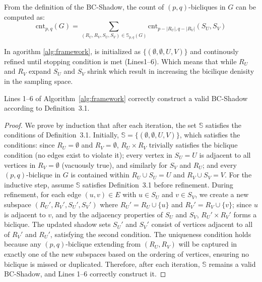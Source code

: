 From the definition of the BC-Shadow, the count of $(p,q)$-bicliques in $G$ can be computed as:
\[
\text{cnt}_{p,q}(G) = \sum_{(R_U, R_V, S_U, S_V) \in \mathbb{S}_{p,q}(G)} \text{cnt}_{p - |R_U|, q - |R_V|}(S_U, S_V)
\]

In agorithm \ref{alg:framework}, \shadow is initialized as $\{(\emptyset,\emptyset,U,V )\}$ and continously refined until stopping condition is met (Lines1--6). Which means that while $R_U$ and $R_V$ expand $S_U$ and $S_V$ shrink which result in increasing the bicilique denisity in the sampling space.


\begin{lemma}
	Lines 1--6 of Algorithm~\ref{alg:framework} correctly construct a valid BC-Shadow according to Definition~3.1.
\end{lemma}

\begin{proof}
	We prove by induction that after each iteration, the set $\mathbb{S}$ satisfies the conditions of Definition~3.1. Initially, $\mathbb{S} = \{ (\emptyset, \emptyset, U, V) \}$, which satisfies the conditions: since $R_U = \emptyset$ and $R_V = \emptyset$, $R_U \times R_V$ trivially satisfies the biclique condition (no edges exist to violate it); every vertex in $S_U = U$ is adjacent to all vertices in $R_V = \emptyset$ (vacuously true), and similarly for $S_V$ and $R_U$; and every $(p,q)$-biclique in $G$ is contained within $R_U \cup S_U = U$ and $R_V \cup S_V = V$. For the inductive step, assume $\mathbb{S}$ satisfies Definition~3.1 before refinement. During refinement, for each edge $(u, v) \in E$ with $u \in S_U$ and $v \in S_V$, we create a new subspace $(R_U', R_V', S_U', S_V')$ where $R_U' = R_U \cup \{ u \}$ and $R_V' = R_V \cup \{ v \}$; since $u$ is adjacent to $v$, and by the adjacency properties of $S_U$ and $S_V$, $R_U' \times R_V'$ forms a biclique. The updated shadow sets $S_U'$ and $S_V'$ consist of vertices adjacent to all of $R_V'$ and $R_U'$, satisfying the second condition. The uniqueness condition holds because any $(p,q)$-biclique extending from $(R_U, R_V)$ will be captured in exactly one of the new subspaces based on the ordering of vertices, ensuring no biclique is missed or duplicated. Therefore, after each iteration, $\mathbb{S}$ remains a valid BC-Shadow, and Lines 1--6 correctly construct it.
\end{proof}
